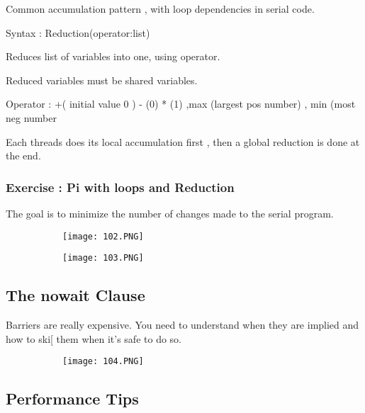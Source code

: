 \documentclass{article}
\begin{document}
Common accumulation pattern , with loop dependencies in serial code. 

Syntax : Reduction(operator:list)

Reduces list of variables into one, using operator.

Reduced variables must be shared variables.

Operator : +( initial value 0 )  -  (0)  * (1) ,max (largest pos number) , min (most neg number

Each threads does its local accumulation first , then a global reduction is done at the end.

\vspace{30mm}

\subsubsection{Exercise : Pi with loops and Reduction}

The goal is to minimize the number of changes made to the serial program.

\begin{figure}[ht!]
  \centering
  \begin{subfigure}[b]{0.5\linewidth}
    \texttt{[image: 102.PNG]}
  \end{subfigure}
     \begin{subfigure}[b]{0.49\textwidth}
         \centering
         \texttt{[image: 103.PNG]}
     \end{subfigure}
\end{figure}

\subsection{The nowait Clause}

Barriers are really expensive. You need to understand when they are implied and how to ski[ them when it's safe to do so.

\begin{figure}[ht!]
  \centering
  \begin{subfigure}[b]{0.5\linewidth}
    \texttt{[image: 104.PNG]}
  \end{subfigure}
\end{figure}



\subsection{Performance Tips}
\end{document}
